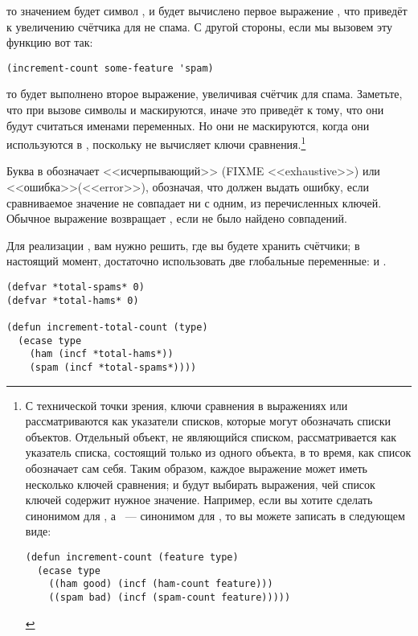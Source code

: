 то значением  будет символ , и будет вычислено первое выражение
, что приведёт к увеличению счётчика для не спама. С другой стороны, если мы
вызовем эту функцию вот так:

\begin{lstlisting}
(increment-count some-feature 'spam)
\end{lstlisting}

то будет выполнено второе выражение, увеличивая счётчик для спама.  Заметьте, что при
вызове  символы  и  маскируются, иначе это
приведёт к тому, что они будут считаться именами переменных.  Но они не маскируются, когда
они используются в , поскольку  не вычисляет ключи
сравнения.\footnote{С технической точки зрения, ключи сравнения в выражениях 
  или  рассматриваются как указатели списков, которые могут обозначать списки
  объектов.  Отдельный объект, не являющийся списком, рассматривается как указатель
  списка, состоящий только из одного объекта, в то время, как список обозначает сам себя.
  Таким образом, каждое выражение может иметь несколько ключей сравнения;  и
   будут выбирать выражения, чей список ключей содержит нужное значение.
  Например, если вы хотите сделать  синонимом для , а ~---
  синонимом для , то вы можете записать  в следующем
  виде:

\begin{lstlisting}
(defun increment-count (feature type)
  (ecase type
    ((ham good) (incf (ham-count feature)))
    ((spam bad) (incf (spam-count feature)))))
\end{lstlisting}

}

Буква  в  обозначает <<исчерпывающий>> (FIXME <<exhaustive>>) или
<<ошибка>>(<<error>>), обозначая, что  должен выдать ошибку, если сравниваемое
значение не совпадает ни с одним, из перечисленных ключей.  Обычное выражение 
возвращает , если не было найдено совпадений.

Для реализации , вам нужно решить, где вы будете хранить
счётчики; в настоящий момент, достаточно использовать две глобальные переменные:
 и .

\begin{lstlisting}
(defvar *total-spams* 0)
(defvar *total-hams* 0)

(defun increment-total-count (type)
  (ecase type
    (ham (incf *total-hams*))
    (spam (incf *total-spams*))))
\end{lstlisting}


